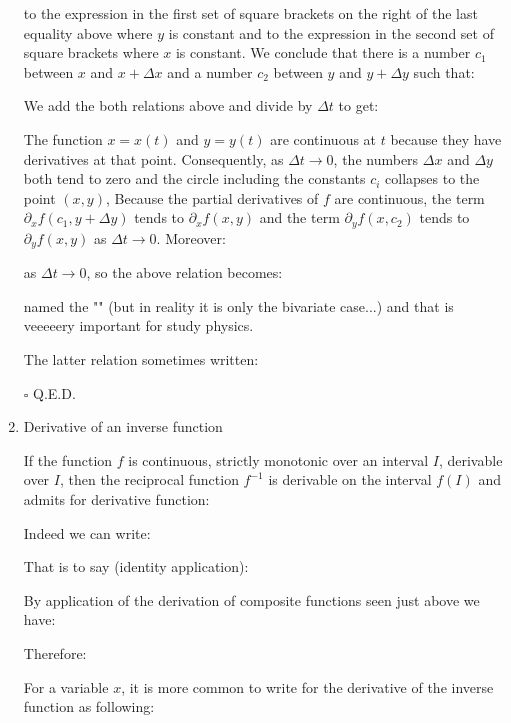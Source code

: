 \begin{enumerate}
\begin{dem}
			 to the expression in the first set of square brackets on the right of the last equality above where $y$ is constant and to the expression in the second set of square brackets where $x$ is constant. We conclude that there is a number $c_1$ between $x$ and $x+\Delta x$ and a number $c_2$ between $y$ and $y+\Delta y$ such that:
			
			We add the both relations above and divide by $\Delta t$ to get:
			
			The function $x=x(t)$ and $y=y(t)$ are continuous at $t$ because they have derivatives at that point. Consequently, as $\Delta t\rightarrow 0$, the numbers $\Delta x$ and $\Delta y$ both tend to zero and the circle including the constants $c_i$ collapses to the point $(x,y)$, Because the partial derivatives of $f$ are continuous, the term $\partial_x f(c_1,y+\Delta y)$ tends to $\partial_x f(x,y)$ and the term $\partial_y f(x,c_2)$ tends to $\partial_y f(x,y)$ as $\Delta t\rightarrow 0$. Moreover:
		
		as $\Delta t\rightarrow 0$, so the above relation becomes:
			
			 named the "" (but in reality it is only the bivariate case...) and that is veeeeery important for study physics.
			 
			 The latter relation sometimes written:
			 
		 	\begin{flushright}
			$\square$  Q.E.D.
			\end{flushright}
		 \end{dem}
		 
		 \item Derivative of an inverse function
		 \begin{theorem}
		 	If the function $f$ is continuous, strictly monotonic over an interval $I$, derivable over $I$, then the reciprocal function $f^{-1}$ is derivable on the interval $f(I)$ and admits for derivative function:
		 	
		 \end{theorem}
		 \begin{dem}
		 	Indeed we can write:
		 	
		 	That is to say (identity application):
		 	
		 	By application of the derivation of composite functions seen just above we have:
		 	
		 	Therefore:
		 	
		 	For a variable $x$, it is more common to write for the derivative of the inverse function as following:
		 	

\end{dem}
\end{enumerate}
